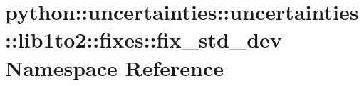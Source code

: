\hypertarget{namespacepython_1_1uncertainties_1_1uncertainties_1_1lib1to2_1_1fixes_1_1fix__std__dev}{
\section{python::uncertainties::uncertainties::lib1to2::fixes::fix\_\-std\_\-dev Namespace Reference}
\label{namespacepython_1_1uncertainties_1_1uncertainties_1_1lib1to2_1_1fixes_1_1fix__std__dev}
}

